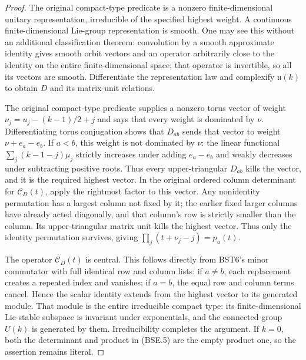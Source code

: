 \documentclass[11pt,a4paper]{article}
\numberwithin{equation}{section}
\theoremstyle{remark}\newtheorem{remark}[theorem]{Remark}
\begin{document}
\begin{proof}
The original compact-type predicate is a nonzero finite-dimensional
unitary representation, irreducible of the specified highest weight.
A continuous finite-dimensional Lie-group representation is smooth.
One may see this without an additional classification theorem:
convolution by a smooth approximate identity gives smooth orbit
vectors and an operator arbitrarily close to the identity on the
entire finite-dimensional space; that operator is invertible,
so all its vectors are smooth.  Differentiate the representation
law and complexify $\mathfrak u(k)$ to obtain $D$ and its
matrix-unit relations.

The original compact-type predicate supplies a nonzero torus
vector of weight $\nu_j=u_j-(k-1)/2+j$ and says that every weight
is dominated by $\nu$.  Differentiating torus conjugation shows
that $D_{ab}$ sends that vector to weight $\nu+e_a-e_b$.
If $a<b$, this weight is not dominated by $\nu$: the linear
functional $\sum_j(k-1-j)\mu_j$ strictly increases under adding
$e_a-e_b$ and weakly decreases under subtracting positive roots.
Thus every upper-triangular $D_{ab}$ kills the vector, and it is
the required highest vector.
In the original ordered column determinant
for $\mathcal C_D(t)$, apply the rightmost factor to this vector.
Any nonidentity permutation has a largest column not fixed by it;
the earlier fixed larger columns have already acted diagonally, and
that column's row is strictly smaller than the column.  Its
upper-triangular matrix unit kills the highest vector.  Thus only
the identity permutation survives, giving
$\prod_j(t+\nu_j-j)=p_u(t)$.

The operator $\mathcal C_D(t)$ is central.  This follows directly
from BST6's minor commutator with full identical row and column
lists: if $a\ne b$, each replacement creates a repeated index and
vanishes; if $a=b$, the equal row and column terms cancel.
Hence the scalar identity extends from the highest vector to its
generated module.  That module is the entire irreducible compact
type: its finite-dimensional Lie-stable subspace is invariant
under exponentials, and the connected group $U(k)$ is generated
by them.  Irreducibility completes the argument.
If $k=0$, both the determinant and product in (BSE.5) are the
empty product one, so the assertion remains literal.
\end{proof}

\end{document}
